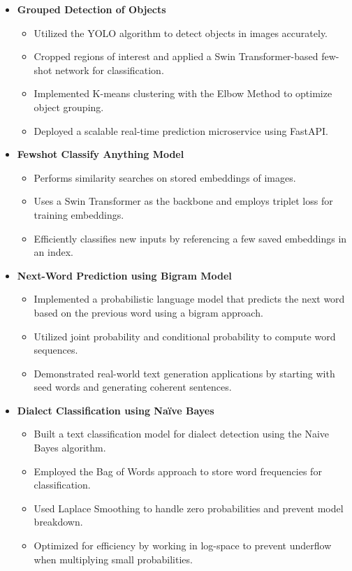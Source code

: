\documentclass[letterpaper,11pt]{article}
\newcommand{\resitem}[1]{\item #1 \vspace{-2pt}}
\begin{document}
\begin{itemize}
\item[]
	\textbf{Grouped Detection of Objects}
	\vspace{-3mm}
	\begin{itemize}
		\resitem{Utilized the YOLO algorithm to detect objects in images accurately.}
		\resitem{Cropped regions of interest and applied a Swin Transformer-based few-shot network for classification.}
		\resitem{Implemented K-means clustering with the Elbow Method to optimize object grouping.}
		\resitem{Deployed a scalable real-time prediction microservice using FastAPI.}
	\end{itemize}

\item[]
	\textbf{Fewshot Classify Anything Model}
	\vspace{-3mm}
	\begin{itemize}
	    \resitem{Performs similarity searches on stored embeddings of images.}
	    \resitem{Uses a Swin Transformer as the backbone and employs triplet loss for training embeddings.}
	    \resitem{Efficiently classifies new inputs by referencing a few saved embeddings in an index.}
	\end{itemize}

\item[]
	\textbf{Next-Word Prediction using Bigram Model}
	\vspace{-3mm}
	\begin{itemize}
	    \resitem{Implemented a probabilistic language model that predicts the next word based on the previous word using a bigram approach.}
	    \resitem{Utilized joint probability and conditional probability to compute word sequences.}
	    \resitem{Demonstrated real-world text generation applications by starting with seed words and generating coherent sentences.}
	\end{itemize}

\item[]
	\textbf{Dialect Classification using Naïve Bayes}
	\vspace{-3mm}
	\begin{itemize}
	    \resitem{Built a text classification model for dialect detection using the Naive Bayes algorithm.}
	    \resitem{Employed the Bag of Words approach to store word frequencies for classification.}
	    \resitem{Used Laplace Smoothing to handle zero probabilities and prevent model breakdown.}
	    \resitem{Optimized for efficiency by working in log-space to prevent underflow when multiplying small probabilities.}
	\end{itemize}

\end{itemize}
\end{document}
